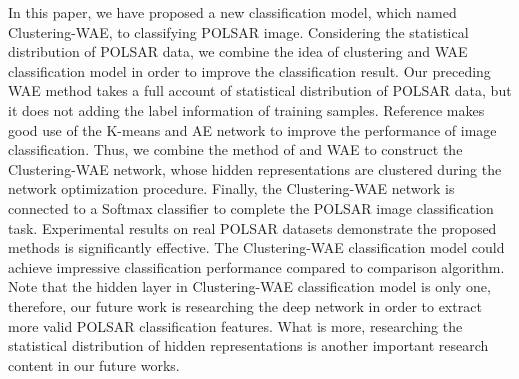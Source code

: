 \documentclass[11pt, a4paper, onecolumn, oneside]{article}
\begin{document}
In this paper, we have proposed a new classification model, which named Clustering-WAE, to classifying POLSAR image. Considering the statistical distribution of POLSAR data, we combine the idea of clustering and WAE classification model in order to improve the classification result. Our preceding WAE method takes a full account of statistical distribution of POLSAR data, but it does not adding the label information of training samples. Reference \cite{u} makes good use of the K-means and AE network to improve the performance of image classification. Thus, we combine the method of \cite{u} and WAE to construct the Clustering-WAE network, whose hidden representations are clustered during the network optimization procedure. Finally, the Clustering-WAE network is connected to a Softmax classifier to complete the POLSAR image classification task. Experimental results on real POLSAR datasets demonstrate the proposed methods is significantly effective. The Clustering-WAE classification model could achieve impressive classification performance compared to comparison algorithm. Note that the hidden layer in Clustering-WAE classification model is only one, therefore, our future work is researching the deep network in order to extract more valid POLSAR classification features. What is more, researching the statistical distribution of hidden representations is another important research content in our future works.
\end{document}
